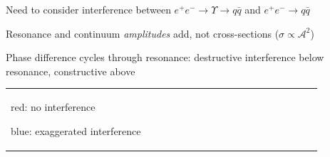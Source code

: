 \documentclass[landscape]{article}
\begin{document}
\begin{slide:interference}

Need to consider interference between $e^+e^- \to \Upsilon \to q\bar{q}$ and $e^+e^- \to q\bar{q}$

\vfill
Resonance and continuum {\it amplitudes} add, not cross-sections \hfill ($\sigma \propto {\mathcal A}^2$)

\vfill
Phase difference cycles through resonance: destructive interference below resonance, \mbox{constructive} above

\vfill
\begin{center}
\begin{tabular}{p{0.45\linewidth} p{0.45\linewidth}}
\begin{minipage}{\linewidth}
\vspace{1.5 cm}
{\color{red} red:} no interference

{\color{blue} blue:} exaggerated interference


\end{minipage}
\end{tabular}
\end{center}
\end{slide:interference}
\end{document}
